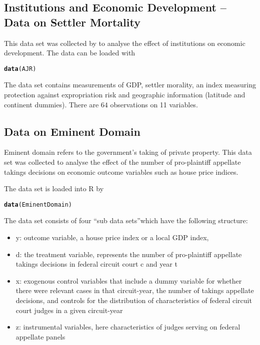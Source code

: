 \documentclass{amsart}\usepackage[]{graphicx}\usepackage[]{color}
\makeatletter
\newcommand{\hlstd}[1]{\textcolor[rgb]{0.345,0.345,0.345}{#1}}%
\newcommand{\hlkwd}[1]{\textcolor[rgb]{0.737,0.353,0.396}{\textbf{#1}}}%
\newenvironment{kframe}{%
 \def\at@end@of@kframe{}%
 \ifinner\ifhmode%
  \def\at@end@of@kframe{\end{minipage}}%
  \begin{minipage}{\columnwidth}%
 \fi\fi%
 \def\FrameCommand##1{\hskip\@totalleftmargin \hskip-\fboxsep
 \colorbox{shadecolor}{##1}\hskip-\fboxsep
     \hskip-\linewidth \hskip-\@totalleftmargin \hskip\columnwidth}%
 \MakeFramed {\advance\hsize-\width
   \@totalleftmargin\z@ \linewidth\hsize
   \@setminipage}}%
 {\par\unskip\endMakeFramed%
 \at@end@of@kframe}
\newenvironment{knitrout}{}{} %
\newcommand{\R}{{\normalfont\textsf{R }}{}}
\makeatother
\begin{document}
\subsection{Institutions and Economic Development -- Data on Settler Mortality} This data set was collected by \citet{acemoglu:colonial}  to analyse the effect of institutions on economic development. The data can be loaded with
\begin{knitrout}
\color{fgcolor}\begin{kframe}
\begin{alltt}
\hlkwd{data}\hlstd{(AJR)}
\end{alltt}
\end{kframe}
\end{knitrout}

The data set contains measurements of GDP, settler morality, an index measuring protection against expropriation risk and geographic information (latitude and continent dummies). There are  $64$ observations on 11 variables.


\subsection{Data on Eminent Domain}
Eminent domain refers to the government's taking of private property. This data set was collected to analyse the effect of the number of pro-plaintiff appellate takings decisions on economic outcome variables such as house price indices. 

The data set is loaded into \R by
\begin{knitrout}
\color{fgcolor}\begin{kframe}
\begin{alltt}
\hlkwd{data}\hlstd{(EminentDomain)}
\end{alltt}
\end{kframe}
\end{knitrout}


The data set consists of four \textquotedblleft sub data sets\textquotedblright which have the following structure:
\begin{itemize}
\item y: outcome variable, a house price index or a local GDP index,
\item d: the treatment variable, represents the number of pro-plaintiff
appellate takings decisions in federal circuit court c and year t
\item x: exogenous control variables that include a dummy variable for whether there were relevant
cases in that circuit-year, the number of takings appellate decisions, and controls for
the distribution of characteristics of federal circuit court judges in a given circuit-year
\item z: instrumental variables, here characteristics of judges serving on federal appellate panels
\end{itemize}
\end{document}
